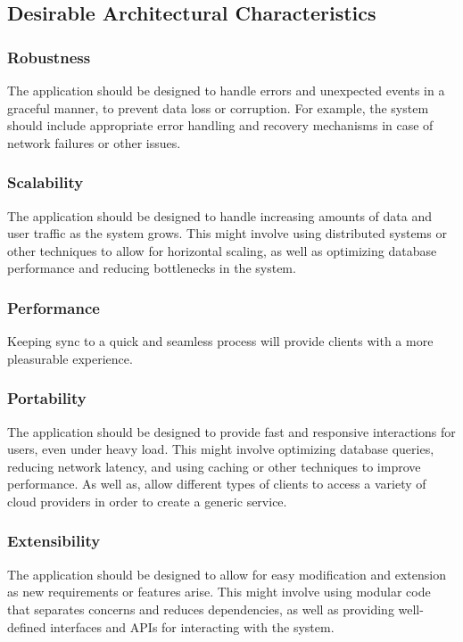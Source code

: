 \documentclass[12pt]{article}
\begin{document}
        \subsection{Desirable Architectural Characteristics}
            \subsubsection{Robustness}
            The application should be designed to handle errors and unexpected events in a graceful manner, to prevent data loss or corruption. For example, the system should include appropriate error handling and recovery mechanisms in case of network failures or other issues.
            \subsubsection{Scalability}
            The application should be designed to handle increasing amounts of data and user traffic as the system grows. This might involve using distributed systems or other techniques to allow for horizontal scaling, as well as optimizing database performance and reducing bottlenecks in the system.
            \subsubsection{Performance}
            Keeping sync to a quick and seamless process will provide clients with a more pleasurable experience. 
            \subsubsection{Portability}
            The application should be designed to provide fast and responsive interactions for users, even under heavy load. This might involve optimizing database queries, reducing network latency, and using caching or other techniques to improve performance. As well as, allow different types of clients to access a variety of cloud providers in order to create a generic service. 
            \subsubsection{Extensibility}
            The application should be designed to allow for easy modification and extension as new requirements or features arise. This might involve using modular code that separates concerns and reduces dependencies, as well as providing well-defined interfaces and APIs for interacting with the system.
\end{document}
